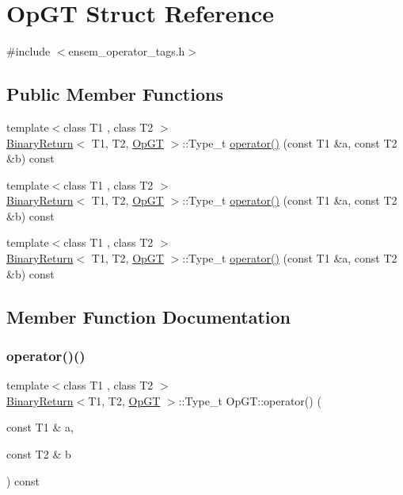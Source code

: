 \hypertarget{structOpGT}{}\section{Op\+GT Struct Reference}
\label{structOpGT}


{\ttfamily \#include $<$ensem\+\_\+operator\+\_\+tags.\+h$>$}

\subsection*{Public Member Functions}
\begin{DoxyCompactItemize}
\item 
{\footnotesize template$<$class T1 , class T2 $>$ }\\\mbox{\hyperlink{structBinaryReturn}{Binary\+Return}}$<$ T1, T2, \mbox{\hyperlink{structOpGT}{Op\+GT}} $>$\+::Type\+\_\+t \mbox{\hyperlink{structOpGT_a8571b221a0c893055b34bdfbd8922fd4}{operator()}} (const T1 \&a, const T2 \&b) const
\item 
{\footnotesize template$<$class T1 , class T2 $>$ }\\\mbox{\hyperlink{structBinaryReturn}{Binary\+Return}}$<$ T1, T2, \mbox{\hyperlink{structOpGT}{Op\+GT}} $>$\+::Type\+\_\+t \mbox{\hyperlink{structOpGT_a8571b221a0c893055b34bdfbd8922fd4}{operator()}} (const T1 \&a, const T2 \&b) const
\item 
{\footnotesize template$<$class T1 , class T2 $>$ }\\\mbox{\hyperlink{structBinaryReturn}{Binary\+Return}}$<$ T1, T2, \mbox{\hyperlink{structOpGT}{Op\+GT}} $>$\+::Type\+\_\+t \mbox{\hyperlink{structOpGT_a8571b221a0c893055b34bdfbd8922fd4}{operator()}} (const T1 \&a, const T2 \&b) const
\end{DoxyCompactItemize}


\subsection{Member Function Documentation}
\mbox{\label{structOpGT_a8571b221a0c893055b34bdfbd8922fd4}} 
\subsubsection{\texorpdfstring{operator()()}{operator()()}\hspace{0.1cm}{\footnotesize\ttfamily [1/3]}}
{\footnotesize\ttfamily template$<$class T1 , class T2 $>$ \\
\mbox{\hyperlink{structBinaryReturn}{Binary\+Return}}$<$T1, T2, \mbox{\hyperlink{structOpGT}{Op\+GT}} $>$\+::Type\+\_\+t Op\+G\+T\+::operator() (\begin{DoxyParamCaption}\item[{const T1 \&}]{a,  }\item[{const T2 \&}]{b }\end{DoxyParamCaption}) const\hspace{0.3cm}{\ttfamily [inline]}}

